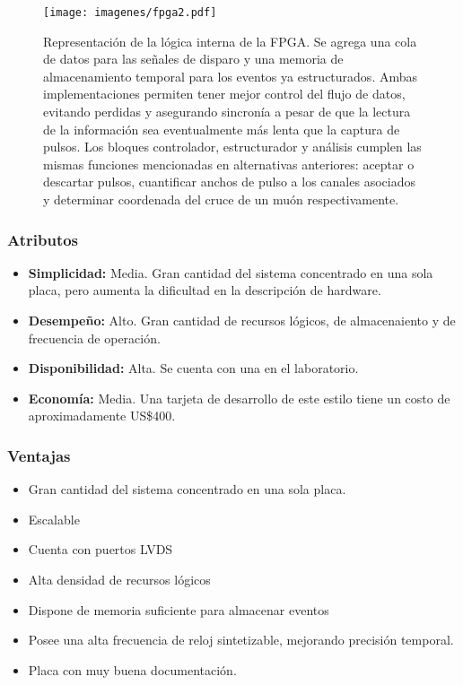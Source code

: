 \begin{figure}[H]
    \centering
    \texttt{[image: imagenes/fpga2.pdf]}
    \caption{Representación de la lógica interna de la FPGA. Se agrega una cola de datos para las señales de disparo y una memoria de almacenamiento temporal para los eventos ya estructurados. Ambas implementaciones permiten tener mejor control del flujo de datos, evitando perdidas y asegurando sincronía a pesar de que la lectura de la información sea eventualmente más lenta que la captura de pulsos. Los bloques controlador, estructurador y análisis cumplen las mismas funciones mencionadas en alternativas anteriores: aceptar o descartar pulsos, cuantificar anchos de pulso a  los canales asociados y determinar coordenada del cruce de un muón respectivamente.}
    \label{fig:fpga2}
\end{figure}

\newpage
\subsubsection*{Atributos}
\begin{itemize}
    \item \textbf{Simplicidad:}  Media. Gran cantidad del sistema concentrado en una sola placa, pero aumenta la dificultad en la descripción de hardware.
    \item \textbf{Desempeño:}  Alto. Gran cantidad de recursos lógicos, de almacenaiento y de frecuencia de operación.
    \item \textbf{Disponibilidad: } Alta. Se cuenta con una en el laboratorio.
    \item \textbf{Economía: } Media. Una tarjeta de desarrollo de este estilo tiene un costo de aproximadamente US\$400.
\end{itemize}

\subsubsection*{Ventajas}
\begin{itemize}
    \item Gran cantidad del sistema concentrado en una sola placa.
    \item Escalable
    \item Cuenta con puertos LVDS
    \item Alta densidad de recursos lógicos
    \item Dispone de memoria suficiente para almacenar eventos
    \item Posee una alta frecuencia de reloj sintetizable, mejorando precisión temporal.
    \item Placa con muy buena documentación.
\end{itemize}


